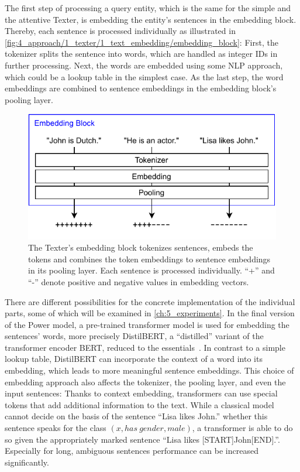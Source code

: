 The first step of processing a query entity, which is the same for the simple and the attentive Texter, is embedding the entity's sentences in the embedding block. Thereby, each sentence is processed individually as illustrated in \autoref{fig:4_approach/1_texter/1_text_embedding/embedding_block}: First, the tokenizer splits the sentence into words, which are handled as integer IDs in further processing. Next, the words are embedded using some NLP approach, which could be a lookup table in the simplest case. As the last step, the word embeddings are combined to sentence embeddings in the embedding block's pooling layer.

\begin{figure}[t]
    \centering
    \includegraphics{4_approach/1_texter/1_text_embedding/embedding_block}
    \caption{The Texter's embedding block tokenizes sentences, embeds the tokens and combines the token embeddings to sentence embeddings in its pooling layer. Each sentence is processed individually. ``+'' and ``-'' denote positive and negative values in embedding vectors.}
    \label{fig:4_approach/1_texter/1_text_embedding/embedding_block}
\end{figure}

There are different possibilities for the concrete implementation of the individual parts, some of which will be examined in \autoref{ch:5_experiments}. In the final version of the Power model, a pre-trained transformer model is used for embedding the sentences' words, more precisely DistilBERT, a ``distilled'' variant of the transformer encoder BERT, reduced to the essentials~\cite{Sanh2019DistilBERTAD}. In contrast to a simple lookup table, DistilBERT can incorporate the context of a word into its embedding, which leads to more meaningful sentence embeddings. This choice of embedding approach also affects the tokenizer, the pooling layer, and even the input sentences: Thanks to context embedding, transformers can use special tokens that add additional information to the text. While a classical model cannot decide on the basis of the sentence ``Lisa likes John.'' whether this sentence speaks for the class $(x, has~gender, male)$, a transformer is able to do so given the appropriately marked sentence ``Lisa likes [START]John[END].''. Especially for long, ambiguous sentences performance can be increased significantly.

